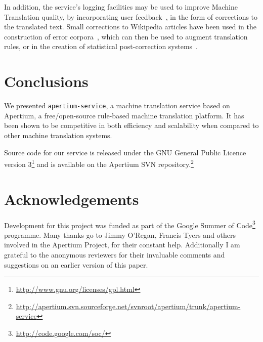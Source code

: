 \documentclass[11pt]{article}
\begin{document}
In addition, the service's logging facilities may be used to improve Machine Translation quality, by incorporating user feedback~\citep{google}, in the form of corrections to the translated text. Small corrections to Wikipedia articles have been used in the construction of error corpora~\citep{milek08}, which can then be used to augment translation rules, or in the creation of statistical post-correction systems~\citep{dugast07}.


\section{Conclusions}

We presented {\tt\small apertium-service}, a machine translation service based on Apertium, a free/open-source rule-based machine translation platform. It has been shown to be competitive in both efficiency and scalability when compared to other machine translation systems.

Source code for our service is released under the GNU General Public Licence version 3\footnote{\small\url{http://www.gnu.org/licenses/gpl.html}} and is available on the Apertium SVN repository.\footnote{{\small\url{http://apertium.svn.sourceforge.net/svnroot/apertium/trunk/apertium-service}}}

\section*{Acknowledgements}

Development for this project was funded as part of the Google Summer of Code\footnote{\small\url{http://code.google.com/soc/}} programme.
Many thanks go to Jimmy O'Regan, Francis Tyers and others involved in the Apertium Project, for their constant help. Additionally I am grateful to the anonymous reviewers for their invaluable comments and suggestions on an earlier version of this paper.



\end{document}
